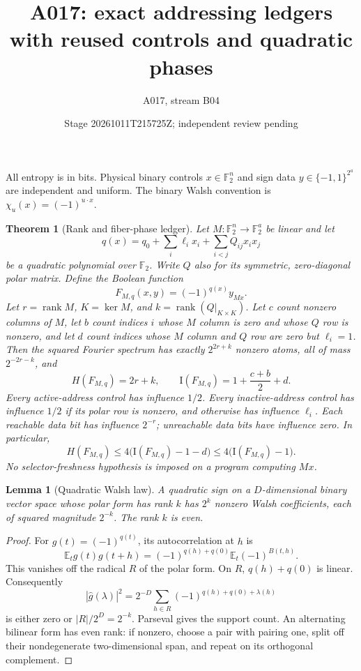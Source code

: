 \documentclass[11pt]{article}
\newtheorem{theorem}{Theorem}
\newtheorem{lemma}{Lemma}
\newcommand{\F}{\mathbb F_2}
\newcommand{\I}{\mathrm I}
\newcommand{\rk}{\operatorname{rank}}
\begin{document}
\title{A017: exact addressing ledgers with reused controls and quadratic phases}
\author{A017, stream B04}
\date{Stage 20261011T215725Z; independent review pending}
\maketitle
All entropy is in bits. Physical binary controls $x\in\F^n$ and sign
data $y\in\{-1,1\}^{2^a}$ are independent and uniform. The binary
Walsh convention is $\chi_u(x)=(-1)^{u\cdot x}$.

\begin{theorem}[Rank and fiber-phase ledger]
Let $M:\F^n\to\F^a$ be linear and let
\[
 q(x)=q_0+\sum_i\ell_i x_i+\sum_{i<j}Q_{ij}x_i x_j
\]
be a quadratic polynomial over $\F$. Write $Q$ also for its symmetric,
zero-diagonal polar matrix. Define the Boolean function
\[
 F_{M,q}(x,y)=(-1)^{q(x)}y_{Mx}.
\]
Let $r=\rk M$, $K=\ker M$, and $k=\rk(Q|_{K\times K})$.
Let $c$ count nonzero columns of $M$, let $b$ count indices $i$ whose
$M$ column is zero and whose $Q$ row is nonzero, and let $d$ count
indices whose $M$ column and $Q$ row are zero but $\ell_i=1$.
Then the squared Fourier spectrum has exactly $2^{2r+k}$ nonzero
atoms, all of mass $2^{-2r-k}$, and
\[
 H(F_{M,q})=2r+k,\qquad \I(F_{M,q})=1+\frac{c+b}{2}+d.
\]
Every active-address control has influence $1/2$. Every inactive-address
control has influence $1/2$ if its polar row is nonzero, and otherwise
has influence $\ell_i$. Each reachable data bit has influence $2^{-r}$;
unreachable data bits have influence zero. In particular,
\[
 H(F_{M,q})\le4\bigl(\I(F_{M,q})-1-d\bigr)
 \le4\bigl(\I(F_{M,q})-1\bigr).
\]
No selector-freshness hypothesis is imposed on a program computing $Mx$.
\end{theorem}

\begin{lemma}[Quadratic Walsh law]
A quadratic sign on a $D$-dimensional binary vector space whose polar
form has rank $k$ has $2^k$ nonzero Walsh coefficients, each of squared
magnitude $2^{-k}$. The rank $k$ is even.
\end{lemma}
\begin{proof}
For $g(t)=(-1)^{q(t)}$, its autocorrelation at $h$ is
\[
 \mathbb E_t g(t)g(t+h)
 =(-1)^{q(h)+q(0)}\mathbb E_t(-1)^{B(t,h)}.
\]
This vanishes off the radical $R$ of the polar form. On $R$,
$q(h)+q(0)$ is linear. Consequently
\[
 |\widehat g(\lambda)|^2
 =2^{-D}\sum_{h\in R}(-1)^{q(h)+q(0)+\lambda(h)}
\]
is either zero or $|R|/2^D=2^{-k}$. Parseval gives the support count.
An alternating bilinear form has even rank: if nonzero, choose a pair
with pairing one, split off their nondegenerate two-dimensional span,
and repeat on its orthogonal complement.
\end{proof}
\end{document}
